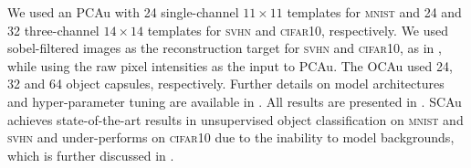 We used an \gls{PCAu} with 24 single-channel $11\times11$ templates for \textsc{mnist} and 24 and 32 three-channel $14\times14$ templates for \textsc{svhn} and \textsc{cifar10}, respectively.
We used sobel-filtered images as the reconstruction target for \textsc{svhn} and \textsc{cifar10}, as in \cite{Jaiswal2018capsule}, while using the raw pixel intensities as the input to \gls{PCAu}.
The \gls{OCAu} used 24, 32 and 64 object capsules, respectively.
Further details on model architectures and hyper-parameter tuning are available in .
All results are presented in .
\gls{SCAu} achieves state-of-the-art results in unsupervised object classification on \textsc{mnist} and \textsc{svhn} and under-performs on \textsc{cifar10} due to the inability to model backgrounds, which is further discussed in .

